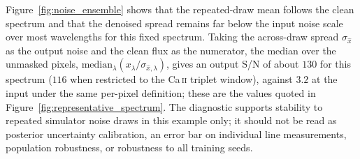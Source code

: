 \documentclass[twocolumn]{aastex7}
\begin{document}
Figure~\ref{fig:noise_ensemble} shows that the repeated-draw mean follows the clean spectrum and that the denoised spread remains far below the input noise scale over most wavelengths for this fixed spectrum. Taking the across-draw spread $\sigma_{\hat{x}}$ as the output noise and the clean flux as the numerator, the median over the unmasked pixels, $\mathrm{median}_{\lambda}(x_{\lambda}/\sigma_{\hat{x},\lambda})$, gives an output S/N of about $130$ for this spectrum ($116$ when restricted to the Ca\,\textsc{ii} triplet window), against $3.2$ at the input under the same per-pixel definition; these are the values quoted in Figure~\ref{fig:representative_spectrum}. The diagnostic supports stability to repeated simulator noise draws in this example only; it should not be read as posterior uncertainty calibration, an error bar on individual line measurements, population robustness, or robustness to all training seeds.



\end{document}
